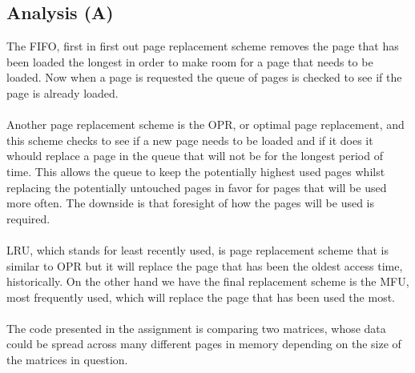 \documentclass[12pt]{article}
\begin{document}
        \subsection{Analysis (A)}
        The FIFO, first in first out page replacement scheme removes the page that has been loaded the longest in order to make room 
        for a page that needs to be loaded. Now when a page is requested the queue of pages is checked to see if the page is already 
        loaded.\\
        \\
        Another page replacement scheme is the OPR, or optimal page replacement, and this scheme checks to see if a new page needs to 
        be loaded and if it does it whould replace a page in the queue that will not be for the longest period of time. This allows
        the queue to keep the potentially highest used pages whilst replacing the potentially untouched pages in favor for pages that 
        will be used more often. The downside is that foresight of how the pages will be used is required.\\
        \\
        LRU, which stands for least recently used, is page replacement scheme that is similar to OPR but it will replace the page that 
        has been the oldest access time, historically. On the other hand we have the final replacement scheme is the MFU, most frequently 
        used, which will replace the page that has been used the most.\\
        \\
        The code presented in the assignment is comparing two matrices, whose data could be spread across many different pages in memory 
        depending on the size of the matrices in question.\\
        \\
\end{document}
